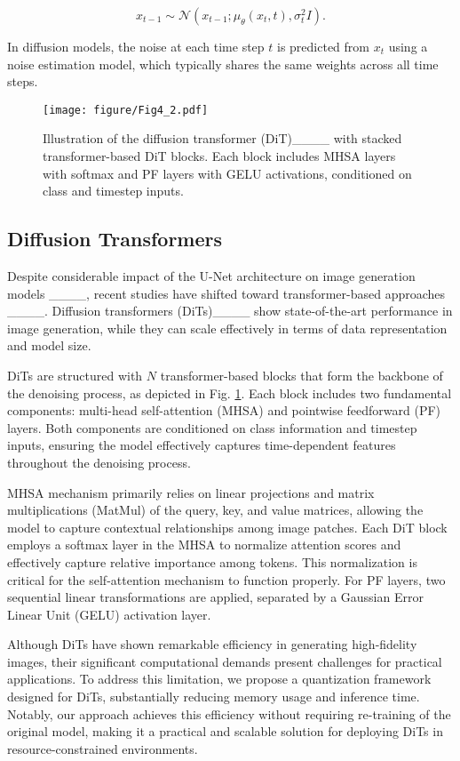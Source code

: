 \begin{equation}
x_{t-1} \sim \mathcal{N}(x_{t-1}; \mu_\theta(x_t, t), \sigma_t^2 I).
\end{equation}

In diffusion models, the noise at each time step $t$ is predicted from $x_t$ using a noise estimation model, which typically shares the same weights across all time steps.

\begin{figure}
    \centering
    \texttt{[image: figure/Fig4\_2.pdf]}
    \caption{Illustration of the diffusion transformer (DiT)____ with stacked transformer-based DiT blocks. Each block includes MHSA layers with softmax and PF layers with GELU activations, conditioned on class and timestep inputs.
    } \label{fig4}
\end{figure}

\subsection{Diffusion Transformers}
\label{ssec:DiT}
Despite considerable impact of the U-Net architecture on image generation models ____, recent studies have shifted toward transformer-based approaches ____. Diffusion transformers (DiTs)____ show state-of-the-art performance in image generation, while they can scale effectively in terms of data representation and model size.

DiTs are structured with $N$ transformer-based blocks that form the backbone of the denoising process, as depicted in Fig. \ref{fig4}. Each block includes two fundamental components: multi-head self-attention (MHSA) and pointwise feedforward (PF) layers. Both components are conditioned on class information and timestep inputs, ensuring the model effectively captures time-dependent features throughout the denoising process. 

MHSA mechanism primarily relies on linear projections and matrix multiplications (MatMul) of the query, key, and value matrices, allowing the model to capture contextual relationships among image patches. Each DiT block employs a softmax layer in the MHSA to normalize attention scores and effectively capture relative importance among tokens. This normalization is critical for the self-attention mechanism to function properly. For PF layers, two sequential linear transformations are applied, separated by a Gaussian Error Linear Unit (GELU) activation layer.

Although DiTs have shown remarkable efficiency in generating high-fidelity images, their significant computational demands present challenges for practical applications. To address this limitation, we propose a quantization framework designed for DiTs, substantially reducing memory usage and inference time. Notably, our approach achieves this efficiency without requiring re-training of the original model, making it a practical and scalable solution for deploying DiTs in resource-constrained environments.

